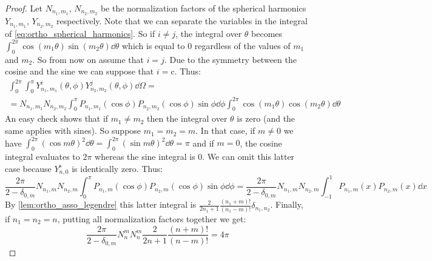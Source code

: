 \documentclass[../main.tex]{subfiles}
\begin{document}
\begin{proof}
  Let $N_{n_1,m_1}$, $N_{n_2,m_2}$ be the normalization factors of the spherical harmonics $Y_{n_1,m_1}$, $Y_{n_2,m_2}$ respectively. Note that we can separate the variables in the integral of \cref{eq:ortho_spherical_harmonics}. So if $i\ne j$, the integral over $\theta$ becomes $\int_0^{2\pi}\cos(m_1\theta)\sin(m_2\theta)\dd{\theta}$ which is equal to 0 regardless of the values of $m_1$ and $m_2$. So from now on assume that $i=j$. Due to the symmetry between the cosine and the sine we can suppose that $i=\mathrm{c}$. Thus:
  \begin{multline}
    \int_0^{2\pi}\int_0^\pi Y_{n_1,m_1}^i(\theta,\phi) Y_{n_2,m_2}^j(\theta,\phi)\dd\Omega=\\= N_{n_1,m_1}N_{n_2,m_2}\int_0^\pi P_{n_1,m_1}(\cos\phi) P_{n_2,m_2}(\cos\phi)\sin\phi\dd\phi\int_{0}^{2\pi}\cos(m_1\theta)\cos(m_2\theta)\dd{\theta}
  \end{multline}
  An easy check shows that if $m_1\neq m_2$ then the integral over $\theta$ is zero (and the same applies with sines). So suppose $m_1=m_2=m$. In that case, if $m\ne 0$ we have $\int_{0}^{2\pi}{(\cos m\theta)}^2\dd{\theta}=\int_{0}^{2\pi}{(\sin m\theta)}^2\dd{\theta}=\pi$ and if $m=0$, the cosine integral evaluates to $2\pi$ whereas the sine integral is 0. We can omit this latter case because $Y_{n,0}^{\mathrm{s}}$ is identically zero. Thus:
  \begin{equation}
    \frac{2\pi}{2-\delta_{0,m}} N_{n_1,m}N_{n_2,m}\int_0^\pi P_{n_1,m}(\cos\phi) P_{n_2,m}(\cos\phi)\sin\phi\dd\phi=\frac{2\pi}{2-\delta_{0,m}} N_{n_1,m}N_{n_2,m}\int_{-1}^1 P_{n_1,m}(x) P_{n_2,m}(x)\dd{x}
  \end{equation}
  By \cref{lem:ortho_asso_legendre} this latter integral is $\frac{2}{2n_1+1}\frac{(n_1+m)!}{(n_1-m)!} \delta_{n_1,n_2}$. Finally, if $n_1=n_2=n$, putting all normalization factors together we get:
  \begin{equation}
    \frac{2\pi}{2-\delta_{0,m}} N_{n}^{m}N_{n}^{m}\frac{2}{2n+1}\frac{(n+m)!}{(n-m)!}=4\pi
  \end{equation}
\end{proof}
\laplaceSolutions*
\end{document}
